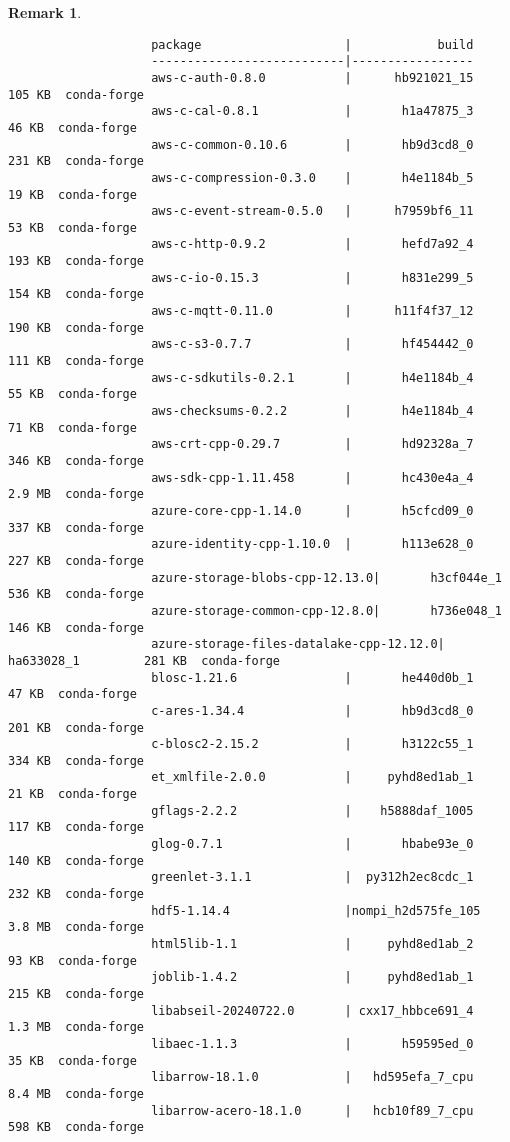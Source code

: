 \documentclass{article}
\newtheorem{remark}{Remark}
\begin{document}
\begin{itemize}
\begin{itemize}
\begin{itemize}
\begin{remark}
\begin{verbatim}
					package                    |            build
					---------------------------|-----------------
					aws-c-auth-0.8.0           |      hb921021_15         105 KB  conda-forge
					aws-c-cal-0.8.1            |       h1a47875_3          46 KB  conda-forge
					aws-c-common-0.10.6        |       hb9d3cd8_0         231 KB  conda-forge
					aws-c-compression-0.3.0    |       h4e1184b_5          19 KB  conda-forge
					aws-c-event-stream-0.5.0   |      h7959bf6_11          53 KB  conda-forge
					aws-c-http-0.9.2           |       hefd7a92_4         193 KB  conda-forge
					aws-c-io-0.15.3            |       h831e299_5         154 KB  conda-forge
					aws-c-mqtt-0.11.0          |      h11f4f37_12         190 KB  conda-forge
					aws-c-s3-0.7.7             |       hf454442_0         111 KB  conda-forge
					aws-c-sdkutils-0.2.1       |       h4e1184b_4          55 KB  conda-forge
					aws-checksums-0.2.2        |       h4e1184b_4          71 KB  conda-forge
					aws-crt-cpp-0.29.7         |       hd92328a_7         346 KB  conda-forge
					aws-sdk-cpp-1.11.458       |       hc430e4a_4         2.9 MB  conda-forge
					azure-core-cpp-1.14.0      |       h5cfcd09_0         337 KB  conda-forge
					azure-identity-cpp-1.10.0  |       h113e628_0         227 KB  conda-forge
					azure-storage-blobs-cpp-12.13.0|       h3cf044e_1         536 KB  conda-forge
					azure-storage-common-cpp-12.8.0|       h736e048_1         146 KB  conda-forge
					azure-storage-files-datalake-cpp-12.12.0|       ha633028_1         281 KB  conda-forge
					blosc-1.21.6               |       he440d0b_1          47 KB  conda-forge
					c-ares-1.34.4              |       hb9d3cd8_0         201 KB  conda-forge
					c-blosc2-2.15.2            |       h3122c55_1         334 KB  conda-forge
					et_xmlfile-2.0.0           |     pyhd8ed1ab_1          21 KB  conda-forge
					gflags-2.2.2               |    h5888daf_1005         117 KB  conda-forge
					glog-0.7.1                 |       hbabe93e_0         140 KB  conda-forge
					greenlet-3.1.1             |  py312h2ec8cdc_1         232 KB  conda-forge
					hdf5-1.14.4                |nompi_h2d575fe_105         3.8 MB  conda-forge
					html5lib-1.1               |     pyhd8ed1ab_2          93 KB  conda-forge
					joblib-1.4.2               |     pyhd8ed1ab_1         215 KB  conda-forge
					libabseil-20240722.0       | cxx17_hbbce691_4         1.3 MB  conda-forge
					libaec-1.1.3               |       h59595ed_0          35 KB  conda-forge
					libarrow-18.1.0            |   hd595efa_7_cpu         8.4 MB  conda-forge
					libarrow-acero-18.1.0      |   hcb10f89_7_cpu         598 KB  conda-forge

\end{verbatim}
\end{remark}
\end{itemize}
\end{itemize}
\end{itemize}
\end{document}
